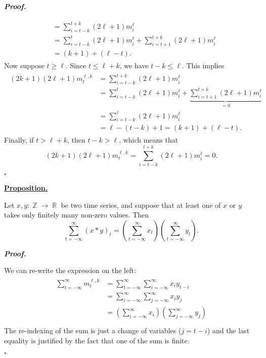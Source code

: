 \documentclass[11 pt]{article}
\newcommand{\1}{\operatorname{\mathbb I}}
\newcommand{\R}{\operatorname{\mathbb R}}
\newcommand{\Z}{\operatorname{\mathbb Z}}
\newcounter{env} %
\newenvironment{abb} %
{
	\begin{mdframed}[bottomline=false,topline=false,leftline=false,rightline=false,nobreak,leftmargin=-10 pt,rightmargin=0 pt,skipabove=0 pt,skipbelow=0 pt]
}
{
	\end{mdframed}
}
\newenvironment{proph}	
{\par
	\noindent \begin{abb} \textbf{\underline{Proposition.}} \par
	\nopagebreak%
	\par
	\itshape%
}
{%
	\par
	\end{abb}
}
\renewenvironment{proof}
{\par
	\begin{mdframed}[skipabove=12 pt,bottomline=false,topline=false,rightline=false]%
	\noindent \textit{\textbf{Proof.}} 
}
{%
	\end{mdframed}\par
	\begin{flushright} \vspace{-35 pt} $\square$ \end{flushright}
	\vspace{-20 pt}
}
\begin{document}
\begin{proof}
\begin{gather*}
\begin{aligned}
            & = \sum_{i=t-k}^{t+k} (2\ell+1)m_i^{\ell}                                            \\
            & = \sum_{i=t-k}^t (2\ell+1)m_i^{\ell} + \sum_{i=t+1}^{t+k} (2\ell+1)m_i^{\ell}       \\
            & = (k+1) + (\ell - t).
        \end{aligned}
    \end{gather*}
    Now suppose $t \ge \ell$. Since $t \le \ell + k$, we have $t - k \le \ell$. This implies
    \begin{gather*}
        \begin{aligned}
            (2k+1)(2\ell+1) m^{\ell,k}_t 
                & = \sum_{i=t-k}^{t+k} (2\ell+1) m_i^{\ell}   \\
                & = \sum_{i=t-k}^t (2\ell+1)m_i^{\ell} + \underbrace{\sum_{i=t+1}^{t+k} (2\ell+1) m_i^{\ell}}_{= 0} \\
                & = \sum_{i=t-k}^{\ell} (2\ell+1) m_i^{\ell}    \\
                & = \ell - (t-k) + 1 = (k+1) + (\ell - t).
        \end{aligned}
    \end{gather*}
    Finally, if $t > \ell + k$, then $t-k > \ell$, which means that
    \[
        (2k+1)(2\ell+1)m^{\ell,k}_t = \sum_{i=t-k}^{t+k} (2\ell+1) m_i^{\ell} = 0.
    \]
\end{proof}

\begin{proph}
    Let $x,y : \Z \to \R$ be two time series, and suppose that at least one of $x$ or $y$ takes only finitely many non-zero values. Then
    \[
        \sum_{t=-\infty}^{\infty} (x * y)_t = \left( \sum_{t=-\infty}^{\infty} x_t \right) \left( \sum_{t=-\infty}^{\infty} y_t \right).
    \]
\end{proph}

\begin{proof}
    We can re-write the expression on the left:
    \begin{gather*}
        \begin{aligned}
            \sum_{t=-\infty}^{\infty} m_t^{\ell,k} 
                & = \sum_{t=-\infty}^{\infty} \sum_{i=-\infty}^{\infty} x_i y_{t-i} \\
                & = \sum_{i=-\infty}^{\infty} \sum_{j=-\infty}^{\infty} x_i y_j \\
                & = \left( \sum_{i=-\infty}^{\infty} x_i \right) \left( \sum_{j=-\infty}^{\infty} y_j \right) \\
        \end{aligned}
    \end{gather*}
    The re-indexing of the sum is just a change of variables ($j=t-i$) and the last equality is justified by the fact that one of the sum is finite.
\end{proof}
\end{document}
